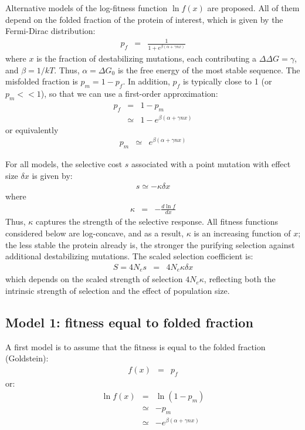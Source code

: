 \documentclass{article}
\begin{document}
Alternative models of the log-fitness function $\ln f(x)$ are proposed. All of them depend on the folded fraction of the protein of interest, which is given by the Fermi-Dirac distribution:
\begin{eqnarray}
p_f &=& \frac{1}{1 + e^{\beta(\alpha + \gamma n x)}}
\end{eqnarray}
where $x$ is the fraction of destabilizing mutations, each contributing a $\Delta \Delta G = \gamma$, and $\beta = 1 / kT$. Thus, $\alpha = \Delta G_0$ is the free energy of the most stable sequence. The misfolded fraction is  $p_m = 1-p_f$. In addition, $p_f$ is typically close to 1 (or $p_m << 1$), so that we can use a first-order approximation:
\begin{eqnarray}
p_f &=& 1 - p_m
\\
&\simeq& 1 - e^{\beta(\alpha + \gamma n x)}
\end{eqnarray}
or equivalently
\begin{eqnarray}
p_m &\simeq& e^{\beta(\alpha + \gamma n x)}
\end{eqnarray}

For all models, the selective cost $s$ associated with a point mutation with effect size $\delta x$ is given by:
\begin{eqnarray}
s \simeq - \kappa \delta x
\end{eqnarray}
where
\begin{eqnarray}
\kappa &=& - \frac{d \ln f}{d x} 
\end{eqnarray}
Thus, $\kappa$ captures the strength of the selective response. All fitness functions considered below are log-concave, and as a result, $\kappa$ is an increasing function of $x$; the less stable the protein already is, the stronger the purifying selection against additional destabilizing mutations. The scaled selection coefficient is:
\begin{eqnarray}
S = 4N_e s  &=& 4 N_e \kappa \delta x
\end{eqnarray}
which depends on the scaled strength of selection $4 N_e \kappa$, reflecting both the intrinsic strength of selection and the effect of population size.

\subsection*{Model 1: fitness equal to folded fraction}

A first model is to assume that the fitness is equal to the folded fraction (Goldstein):
\begin{eqnarray}
f(x) &=& p_f
\end{eqnarray}
or:
\begin{eqnarray}
\ln f(x) &=& \ln (1 - p_m)
\\
& \simeq & - p_m
\\
& \simeq & - e^{\beta(\alpha + \gamma n x)}
\end{eqnarray}
\end{document}
